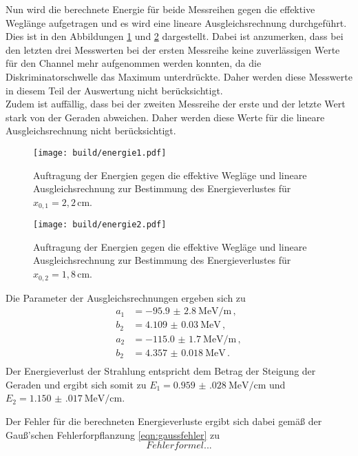 Nun wird die berechnete Energie für beide Messreihen gegen die effektive Weglänge aufgetragen
und es wird eine lineare Ausgleichsrechnung durchgeführt. Dies ist in den Abbildungen
\ref{fig:energie1} und \ref{fig:energie2} dargestellt. Dabei ist anzumerken, dass bei
den letzten drei Messwerten bei der ersten Messreihe keine zuverlässigen Werte für den
Channel mehr aufgenommen werden konnten, da die Diskriminatorschwelle das Maximum
unterdrückte. Daher werden diese Messwerte in diesem Teil der Auswertung nicht berücksichtigt.\\
Zudem ist auffällig, dass bei der zweiten Messreihe der erste und der letzte Wert stark von
der Geraden abweichen. Daher werden diese Werte für die lineare Ausgleichsrechnung nicht berücksichtigt.

\begin{figure}[H]
  \centering
  \texttt{[image: build/energie1.pdf]}
  \caption{Auftragung der Energien gegen die effektive Wegläge und lineare Ausgleichsrechnung
  zur Bestimmung des Energieverlustes für $x_{0,1}=2{,}2\,$cm.}
  \label{fig:energie1}
\end{figure}

\begin{figure}[H]
  \centering
  \texttt{[image: build/energie2.pdf]}
  \caption{Auftragung der Energien gegen die effektive Wegläge und lineare Ausgleichsrechnung
  zur Bestimmung des Energieverlustes für $x_{0,2}=1{,}8\,$cm.}
  \label{fig:energie2}
\end{figure}

Die Parameter der Ausgleichsrechnungen ergeben sich zu
\begin{align*}
  a_1 &= \SI{-95.9(28)}{\MeV\per\meter} \,,\\
  b_2 &= \SI{4.109(0030)}{\MeV} \,,\\
  a_2 &= \SI{-115.0(17)}{\MeV\per\meter} \,,\\
  b_2 &= \SI{4.357(0018)}{\MeV} \,.\\
\end{align*}
Der Energieverlust der Strahlung entspricht dem Betrag der Steigung der Geraden und ergibt sich
somit zu $E_1=\SI{0.959(028)}{\MeV\per\centi\meter}$ und
$E_2=\SI{1.150(017)}{\MeV\per\centi\meter}$.

Der Fehler für die berechneten Energieverluste ergibt sich dabei gemäß der Gauß'schen
Fehlerforpflanzung \eqref{eqn:gaussfehler} zu
\begin{equation}
  Fehlerformel...
\end{equation}


